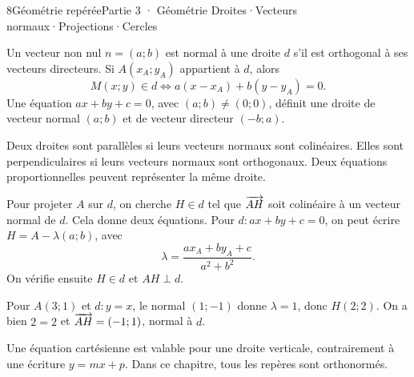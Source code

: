 \begin{ouverture}[cercleplan]{8}{Géométrie repérée}{Partie 3 · Géométrie}
{Droites\enspace·\enspace Vecteurs normaux\enspace·\enspace Projections\enspace·\enspace Cercles}
\end{ouverture}
\essentiel
{}
\begin{definition}
Un vecteur non nul $n=(a;b)$ est normal à une droite $d$ s'il est orthogonal
à ses vecteurs directeurs. Si $A(x_A;y_A)$ appartient à $d$, alors
\[M(x;y)\in d\iff a(x-x_A)+b(y-y_A)=0.\]
Une équation $ax+by+c=0$, avec $(a;b)\neq(0;0)$, définit une droite de
vecteur normal $(a;b)$ et de vecteur directeur $(-b;a)$.
\end{definition}
\begin{propriete}
Deux droites sont parallèles si leurs vecteurs normaux sont colinéaires.
Elles sont perpendiculaires si leurs vecteurs normaux sont orthogonaux.
Deux équations proportionnelles peuvent représenter la même droite.
\end{propriete}
\begin{savoirfaire}
Pour projeter $A$ sur $d$, on cherche $H\in d$ tel que $\overrightarrow{AH}$ soit
colinéaire à un vecteur normal de $d$. Cela donne deux équations.
Pour $d:ax+by+c=0$, on peut écrire $H=A-\lambda(a;b)$, avec
\[\lambda=\frac{ax_A+by_A+c}{a^2+b^2}.\]
On vérifie ensuite $H\in d$ et $AH\perp d$.
\end{savoirfaire}
\begin{exemple}
Pour $A(3;1)$ et $d:y=x$, le normal $(1;-1)$ donne $\lambda=1$,
donc $H(2;2)$. On a bien $2=2$ et $\overrightarrow{AH}=(-1;1)$, normal à $d$.
\end{exemple}
\begin{attention}
Une équation cartésienne est valable pour une droite verticale, contrairement
à une écriture $y=mx+p$. Dans ce chapitre, tous les repères sont orthonormés.
\end{attention}

